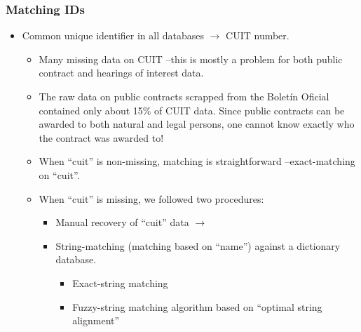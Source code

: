 \documentclass[handout,final,xcolor=dvipsnames]{beamer}
\begin{document}
  
    \begin{frame}\frametitle{Matching IDs}
  \begin{itemize}\itemsep 10pt
  \item Common unique identifier in all databases $\longrightarrow$
    CUIT number.
    \begin{itemize}
    \item Many missing data on CUIT
      --this is mostly a problem for both public contract and hearings
      of interest data. 
      \item The raw data on public contracts scrapped from the Boletín
        Oficial contained only about 15\% of CUIT data. Since public
        contracts can be awarded to both natural and legal persons,
        one cannot know exactly who the contract was awarded to!
      \item When ``cuit'' is non-missing, matching is straightforward
        --exact-matching on ``cuit''. 
      \item When ``cuit'' is missing, we followed two procedures:
        \begin{itemize}
        \item Manual recovery of ``cuit'' data $\longrightarrow$
          \item String-matching (matching based on ``name'') against a
            dictionary database.
            \begin{itemize}
            \item Exact-string matching
              \item Fuzzy-string matching algorithm based on ``optimal
                string alignment''
              \end{itemize}
              \end{itemize}
      \end{itemize}
    \end{itemize}
\end{frame}
\end{document}
